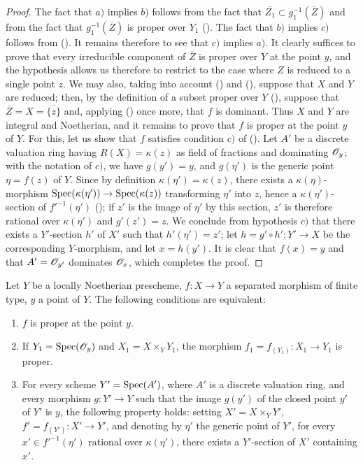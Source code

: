 \begin{proof}
The fact that $a)$ implies $b)$ follows from the fact that $\overline{Z_1}\subset g_1^{-1}(\overline{Z})$ and from the fact that $g_1^{-1}(\overline{Z})$ is proper over $Y_1$ ().
The fact that $b)$ implies $c)$ follows from ().
It remains therefore to see that $c)$ implies $a)$.
It clearly suffices to prove that every irreducible component of $\overline{Z}$ is proper over $Y$ at the point $y$, and the hypothesis allows us therefore to restrict to the case where $Z$ is reduced to a single point $z$.
We may also, taking into account () and (), suppose that $X$ and $Y$ are reduced; then, by the definition of a subset proper over $Y$ (), suppose that $\overline{Z}=X=\overline{\{z\}}$ and, applying () once more, that $f$ is dominant. Thus $X$ and $Y$ are integral and Noetherian, and it remains to prove that $f$ is proper at the point $y$ of $Y$. For this, let us show that $f$ satisfies condition $c)$ of ().
Let $A'$ be a discrete valuation ring having $R(X)=\kappa(z)$ as field of fractions and dominating $\mathscr{O}_y$; with the notation of $c)$, we have $g(y')=y$, and $g(\eta')$ is the generic point $\eta=f(z)$ of $Y$.
Since by definition $\kappa(\eta')=\kappa(z)$, there exists a $\kappa(\eta)$-morphism $\operatorname{Spec}(\kappa(\eta'))\to\operatorname{Spec}(\kappa(z))$ transforming $\eta'$ into $z$, hence a $\kappa(\eta')$-section of $f'^{-1}(\eta')$ (); if $z'$ is the image of $\eta'$ by this section, $z'$ is therefore rational over $\kappa(\eta')$ and $g'(z')=z$.
We conclude from hypothesis $c)$ that there exists a $Y'$-section $h'$ of $X'$ such that $h'(\eta')=z'$; let $h=g'\circ h':Y'\to X$ be the corresponding $Y$-morphism, and let $x=h(y')$. It is clear that $f(x)=y$ and that $A'=\mathscr{O}_{y'}$ dominates $\mathscr{O}_x$, which completes the proof.
\end{proof}

\begin{corollary}[15.7.5]
\label{IV.15.7.5}
Let $Y$ be a locally Noetherian prescheme, $f:X\to Y$ a separated morphism of finite type, $y$ a point of $Y$.
The following conditions are equivalent:
\begin{enumerate}[label=\emph{\alph*)}]
  \item $f$ is proper at the point $y$.
  \item If $Y_1=\operatorname{Spec}(\mathscr{O}_y)$ and $X_1=X\times_Y Y_1$, the morphism $f_1=f_{(Y_1)}:X_1\to Y_1$ is proper.
  \item For every scheme $Y'=\operatorname{Spec}(A')$, where $A'$ is a discrete valuation ring, and every morphism $g:Y'\to Y$ such that the image $g(y')$ of the closed point $y'$ of $Y'$ is $y$, the following property holds: setting $X'=X\times_Y Y'$, $f'=f_{(Y')}:X'\to Y'$, and denoting by $\eta'$ the generic point of $Y'$, for every $x'\in f'^{-1}(\eta')$ rational over $\kappa(\eta')$, there exists a $Y'$-section of $X'$ containing $x'$.
\end{enumerate}
\end{corollary}

